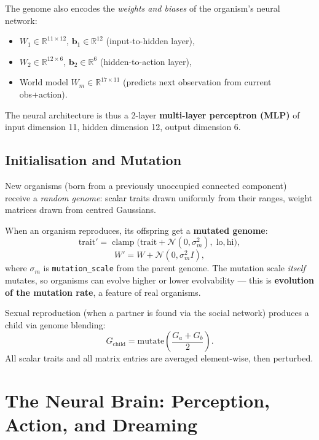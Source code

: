 \documentclass[12pt,a4paper]{article}
\newcommand{\RR}{\mathbb{R}}
\newcommand{\vv}[1]{\mathbf{#1}}
\DeclareMathOperator{\clamp}{clamp}
\begin{document}
The genome also encodes the \emph{weights and biases} of the
organism's neural network:
\begin{itemize}[nosep]
  \item $W_1 \in \RR^{11 \times 12}$, $\vv{b}_1 \in \RR^{12}$
    (input-to-hidden layer),
  \item $W_2 \in \RR^{12 \times 6}$, $\vv{b}_2 \in \RR^{6}$
    (hidden-to-action layer),
  \item World model $W_m \in \RR^{17 \times 11}$
    (predicts next observation from current obs+action).
\end{itemize}

The neural architecture is thus a 2-layer
\textbf{multi-layer perceptron (MLP)} of
input dimension 11, hidden dimension 12, output dimension 6.

\subsection{Initialisation and Mutation}

New organisms (born from a previously unoccupied connected component)
receive a \emph{random genome}:
scalar traits drawn uniformly from their ranges,
weight matrices drawn from centred Gaussians.

When an organism reproduces, its offspring get a
\textbf{mutated genome}:
\begin{equation}
  \text{trait}' = \clamp\!\bigl(
    \text{trait} + \mathcal{N}(0, \sigma_m^2),\;
    \text{lo}, \text{hi}\bigr),
\end{equation}
\begin{equation}
  W' = W + \mathcal{N}(0, \sigma_m^2 I),
\end{equation}
where $\sigma_m$ is \texttt{mutation\_scale} from the parent genome.
The mutation scale \emph{itself} mutates, so organisms can evolve
higher or lower evolvability — this is
\textbf{evolution of the mutation rate}, a feature of real organisms.

Sexual reproduction (when a partner is found via the social network)
produces a child via genome blending:
\[
  G_\text{child} = \text{mutate}\!\left(\frac{G_a + G_b}{2}\right).
\]
All scalar traits and all matrix entries are averaged element-wise,
then perturbed.

\section{The Neural Brain: Perception, Action, and Dreaming}
\end{document}
